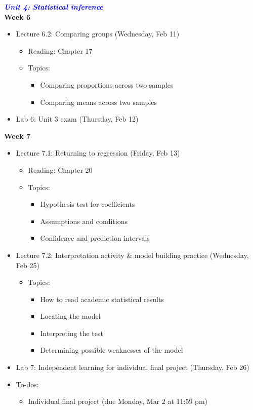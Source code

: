 \documentclass[11pt]{article}
\begin{document}
\Large \textcolor{blue}{\textit{\textbf{Unit 4: Statistical inference}}} \\

\large \textbf{Week 6}

\begin{itemize}
    \item Lecture 6.2: Comparing groups (Wednesday, Feb 11)
    \begin{itemize}
        \item Reading: Chapter 17
        \item Topics:
        \begin{itemize}
            \item Comparing proportions across two samples
            \item Comparing means across two samples
        \end{itemize}
    \end{itemize}
    \item Lab 6: Unit 3 exam (Thursday, Feb 12)
\end{itemize}


\textbf{Week 7}
\begin{itemize}
    \item Lecture 7.1: Returning to regression (Friday, Feb 13)
    \begin{itemize}
        \item Reading: Chapter 20
        \item Topics:
        \begin{itemize}
            \item Hypothesis test for coefficients
            \item Assumptions and conditions
            \item Confidence and prediction intervals
        \end{itemize}
    \end{itemize}
    \item Lecture 7.2: Interpretation activity \& model building practice (Wednesday, Feb 25)
    \begin{itemize}
        \item Topics:
        \begin{itemize}
            \item How to read academic statistical results
            \item Locating the model
            \item Interpreting the test
            \item Determining possible weaknesses of the model
        \end{itemize}
    \end{itemize}
    \item Lab 7: Independent learning for individual final project (Thursday, Feb 26)
    \item To-dos: 
    \begin{itemize}
        \item Individual final project (due Monday, Mar 2 at 11:59 pm)
    \end{itemize}
\end{itemize}
\end{document}
